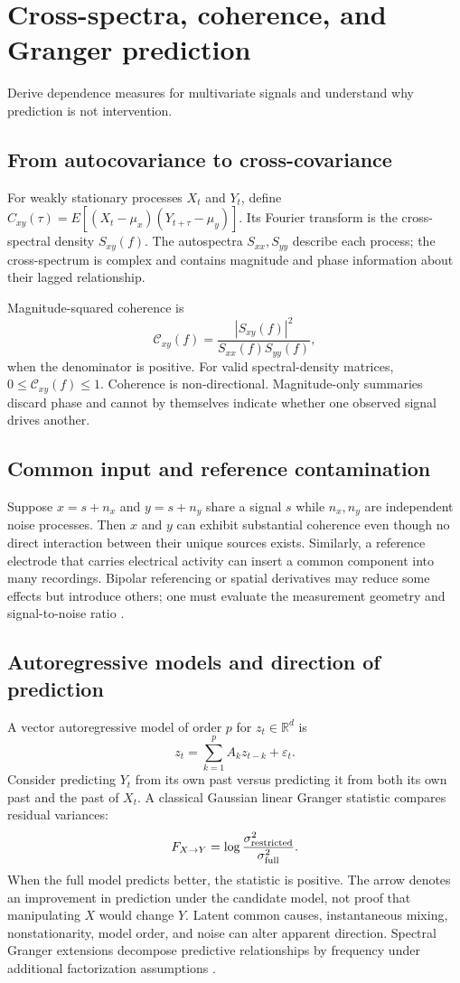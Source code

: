 \chapter{Cross-spectra, coherence, and Granger prediction}\label{ch:connectivity}
\begin{readergoal}Derive dependence measures for multivariate signals and understand why prediction is not intervention.\end{readergoal}
\section{From autocovariance to cross-covariance}
For weakly stationary processes $X_t$ and $Y_t$, define $C_{xy}(\tau)=E[(X_t-\mu_x)(Y_{t+\tau}-\mu_y)]$. Its Fourier transform is the cross-spectral density $S_{xy}(f)$. The autospectra $S_{xx},S_{yy}$ describe each process; the cross-spectrum is complex and contains magnitude and phase information about their lagged relationship.

Magnitude-squared coherence is
\[\mathcal C_{xy}(f)=\frac{|S_{xy}(f)|^2}{S_{xx}(f)S_{yy}(f)},\]
when the denominator is positive. For valid spectral-density matrices, $0\le\mathcal C_{xy}(f)\le1$. Coherence is non-directional. Magnitude-only summaries discard phase and cannot by themselves indicate whether one observed signal drives another.

\section{Common input and reference contamination}
Suppose $x=s+n_x$ and $y=s+n_y$ share a signal $s$ while $n_x,n_y$ are independent noise processes. Then $x$ and $y$ can exhibit substantial coherence even though no direct interaction between their unique sources exists. Similarly, a reference electrode that carries electrical activity can insert a common component into many recordings. Bipolar referencing or spatial derivatives may reduce some effects but introduce others; one must evaluate the measurement geometry and signal-to-noise ratio \cite{Bastos2016,CohenTsuchiya2018}.

\section{Autoregressive models and direction of prediction}
A vector autoregressive model of order $p$ for $z_t\in\mathbb R^d$ is
\[z_t=\sum_{k=1}^p A_kz_{t-k}+\varepsilon_t.\]
Consider predicting $Y_t$ from its own past versus predicting it from both its own past and the past of $X_t$. A classical Gaussian linear Granger statistic compares residual variances:
\[F_{X\to Y}=\log\frac{\sigma^2_{\rm restricted}}{\sigma^2_{\rm full}}.\]
When the full model predicts better, the statistic is positive. The arrow denotes an improvement in prediction under the candidate model, not proof that manipulating $X$ would change $Y$. Latent common causes, instantaneous mixing, nonstationarity, model order, and noise can alter apparent direction. Spectral Granger extensions decompose predictive relationships by frequency under additional factorization assumptions \cite{Cekic2018}.

